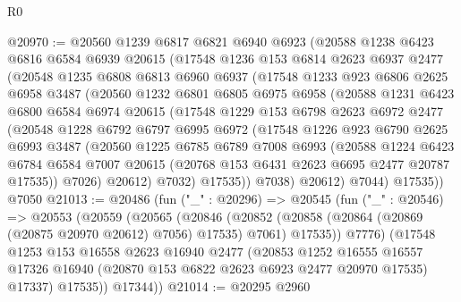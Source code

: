 \begin{lexlean}{R0}
\begin{coremodule}
@20970 := @20560
    @1239
    @6817
    @6821
    @6940
    @6923
    (@20588
      @1238
      @6423
      @6816
      @6584
      @6939
      @20615
      (@17548
        @1236
        @153
        @6814
        @2623
        @6937
        @2477
        (@20548
          @1235
          @6808
          @6813
          @6960
          @6937
          (@17548
            @1233
            @923
            @6806
            @2625
            @6958
            @3487
            (@20560
              @1232
              @6801
              @6805
              @6975
              @6958
              (@20588
                @1231
                @6423
                @6800
                @6584
                @6974
                @20615
                (@17548
                  @1229
                  @153
                  @6798
                  @2623
                  @6972
                  @2477
                  (@20548
                    @1228
                    @6792
                    @6797
                    @6995
                    @6972
                    (@17548
                      @1226
                      @923
                      @6790
                      @2625
                      @6993
                      @3487
                      (@20560
                        @1225
                        @6785
                        @6789
                        @7008
                        @6993
                        (@20588
                          @1224
                          @6423
                          @6784
                          @6584
                          @7007
                          @20615
                          (@20768 @153 @6431 @2623 @6695 @2477 @20787 @17535))
                        @7026)
                      @20612)
                    @7032)
                  @17535))
              @7038)
            @20612)
          @7044)
        @17535))
    @7050
@21013 := @20486
    (fun ("_" : @20296) =>
    @20545
      (fun ("_" : @20546) =>
      @20553
        (@20559
          (@20565
            (@20846
              (@20852 (@20858 (@20864 (@20869 (@20875 @20970 @20612) @7056) @17535) @7061) @17535))
            @7776)
          (@17548
            @1253
            @153
            @16558
            @2623
            @16940
            @2477
            (@20853
              @1252
              @16555
              @16557
              @17326
              @16940
              (@20870 @153 @6822 @2623 @6923 @2477 @20970 @17535)
              @17337)
            @17535))
        @17344))
@21014 := @20295 @2960

\end{coremodule}
\end{lexlean}
